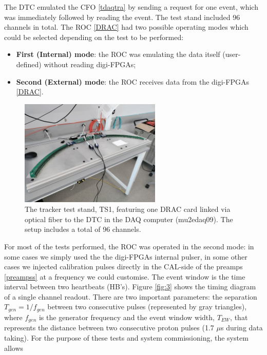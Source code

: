     The DTC emulated the CFO \ref{tdaqtra} by sending a request 
    for one event, which was immediately followed by reading the event.
    The test stand included 96 channels in total.
    The ROC \ref{DRAC} had two possible operating modes 
    which could be selected depending on the test to be performed:
    \begin{itemize}
    \item  \textbf{First (Internal) mode}: the ROC was emulating the data 
    itself (user-defined) without reading digi-FPGAs;
    \item  \textbf{Second (External) mode}: the ROC receives data 
    from the digi-FPGAs \ref{DRAC}.
    \end{itemize}
    \begin{figure}[!h]
        \centering
        \includegraphics[width =0.6\textwidth]{figures/jpg/IMG_20240219_090538.jpg}
        \caption{The tracker test stand, TS1, featuring one DRAC card linked 
        via optical fiber to the DTC in the DAQ computer (mu2edaq09). The 
        setup includes a total of 96 channels.}
        \label{fig:TS1}
        \end{figure}
    For most of the tests performed, the ROC was operated 
    in the second mode: in some cases we simply used the the 
    digi-FPGAs internal pulser, in some other cases we injected 
    calibration pulses directly in the CAL-side of the preamps \ref{preampss} at 
    a frequency we could customise.
    The event window is the time interval between two heartbeats (HB's). 
    Figure \ref{fig:3} shows the timing diagram of a single channel readout.
    There are two important parameters: the separation $T_{gen}=1/f_{gen}$ between 
    two consecutive pulses (represented by gray triangles), 
    where $f_{gen}$ is the generator frequency and the event window width, $T_{EW}$, 
    that represents the distance between two consecutive proton pulses (1.7 $\mu$s during data 
    taking). 
    For the purpose of these tests and system commissioning, the system allows 
